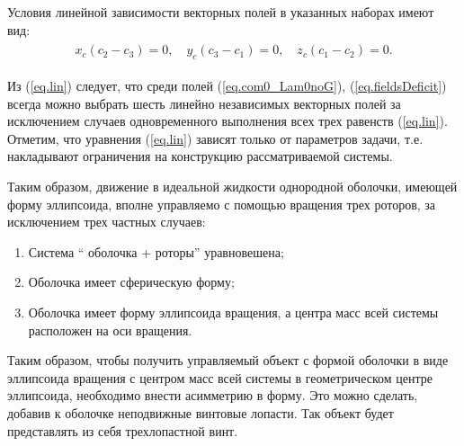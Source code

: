 %

Условия линейной зависимости векторных полей в указанных наборах имеют вид:
\begin{gather}
\begin{gathered}
x_c(c_2 - c_3) = 0,\quad
y_c(c_3-c_1) = 0, \quad
z_c(c_1-c_2) = 0.
\end{gathered}\label{eq.lin}
\end{gather}

Из (\ref{eq.lin}) следует, что среди полей (\ref{eq.com0_Lam0noG}), (\ref{eq.fieldsDeficit}) всегда можно выбрать шесть линейно независимых векторных полей за исключением случаев одновременного выполнения всех трех равенств (\ref{eq.lin}). Отметим, что уравнения (\ref{eq.lin}) зависят только от параметров задачи, т.е. накладывают ограничения на конструкцию рассматриваемой системы.

Таким образом, движение в идеальной жидкости однородной оболочки, имеющей форму эллипсоида, вполне управляемо с помощью вращения трех роторов, за исключением трех частных случаев:
\begin{enumerate}
	\item Система “ оболочка + роторы” уравновешена;
	\item Оболочка имеет сферическую форму;
	\item Оболочка имеет форму эллипсоида вращения, а центра масс всей системы	расположен на оси вращения.
\end{enumerate}

Таким образом, чтобы получить управляемый объект с формой оболочки в виде эллипсоида вращения с центром масс всей системы в геометрическом центре эллипсоида, необходимо внести асимметрию в форму. Это можно сделать, добавив к оболочке неподвижные винтовые лопасти. Так объект будет представлять из себя трехлопастной винт. 

